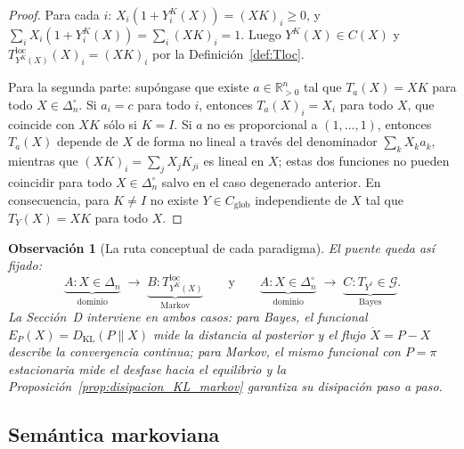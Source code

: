 ﻿\documentclass[12pt]{article}
\newtheorem{observacion}{Observación}[section]
\begin{document}
\begin{proof}
Para cada $i$: $X_i(1+Y^K_i(X))=(XK)_i\ge 0$, y $\sum_i X_i(1+Y^K_i(X))=\sum_i(XK)_i=1$. Luego $Y^K(X)\in C(X)$ y $T^{\mathrm{loc}}_{Y^K(X)}(X)_i=(XK)_i$ por la Definición~\ref{def:Tloc}.

Para la segunda parte: supóngase que existe $a\in\mathbb{R}_{>0}^n$ tal que $T_a(X)=XK$ para todo $X\in\Delta_n^\circ$. Si $a_i=c$ para todo $i$, entonces $T_a(X)_i=X_i$ para todo $X$, que coincide con $XK$ sólo si $K=I$. Si $a$ no es proporcional a $(1,\dots,1)$, entonces $T_a(X)$ depende de $X$ de forma no lineal a través del denominador $\sum_k X_k a_k$, mientras que $(XK)_i=\sum_j X_j K_{ji}$ es lineal en $X$; estas dos funciones no pueden coincidir para todo $X\in\Delta_n^\circ$ salvo en el caso degenerado anterior. En consecuencia, para $K\neq I$ no existe $Y\in C_{\mathrm{glob}}$ independiente de $X$ tal que $T_Y(X)=XK$ para todo $X$.
\end{proof}

\begin{observacion}[La ruta conceptual de cada paradigma]\label{obs:rutas_paradigmas}
El puente queda así fijado:
\[
\underbrace{A: X\in\Delta_n}_{\text{dominio}}
\;\longrightarrow\;
\underbrace{B: T^{\mathrm{loc}}_{Y^K(X)}}_{\text{Markov}}
\qquad\text{y}\qquad
\underbrace{A: X\in\Delta_n^\circ}_{\text{dominio}}
\;\longrightarrow\;
\underbrace{C: T_{Y^\ell}\in\mathcal{G}}_{\text{Bayes}}.
\]
La Sección~D interviene en ambos casos: para Bayes, el funcional $E_P(X)=D_{\mathrm{KL}}(P\|X)$ mide la distancia al posterior y el flujo $\dot X=P-X$ describe la convergencia continua; para Markov, el mismo funcional con $P=\pi$ estacionaria mide el desfase hacia el equilibrio y la Proposición~\ref{prop:disipacion_KL_markov} garantiza su disipación paso a paso.
\end{observacion}

\subsection{Semántica markoviana}
\end{document}
